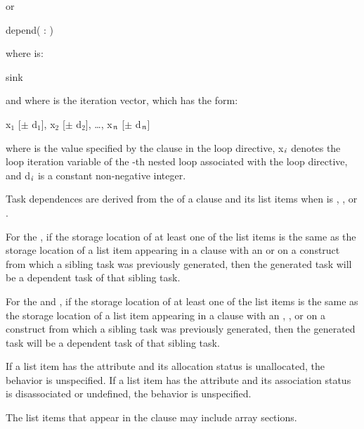 or

\begin{boxedcode}
depend( : )
\end{boxedcode}

where  is:
\begin{indentedcodelist}
sink
\end{indentedcodelist}

and where  is the iteration vector, which has the form:

x$_{1}$ [$\pm $ d$_{1}$], x$_{2}$ [$\pm $ d$_{2}$], \ldots, x$_{{\textrm{\textmd{\itshape{n}}}}}$ [$\pm $ d$_{{\textrm{\textmd{\itshape{n}}}}}$]

where  is the value specified by the  clause in the loop
directive, x$_{{\textrm{\textmd{\itshape{i}}}}}$ denotes the loop iteration variable of the -th
nested loop associated with the loop directive, and d$_{{\textrm{\textmd{\itshape{i}}}}}$ is a
constant non-negative integer.

\descr
Task dependences are derived from the  of a  clause and its list 
items when  is , , or .

For the  , if the storage location of at least one
of the list items is the same as the storage location of a list item appearing
in a  clause with an  or   on a construct
from which a sibling task was previously generated, then the generated task
will be a dependent task of that sibling task.

For the  and  , if the storage location of at least one
of the list items is the same as the storage location of a list item appearing
in a  clause with an , , or   on
a construct from which a sibling task was previously generated, then the
generated task will be a dependent task of that sibling task.

\begin{fortranspecific}
If a list item has the  attribute and its allocation
status is unallocated, the behavior is unspecified. If a list item has
the  attribute and its association status is
disassociated or undefined, the behavior is unspecified.

The list items that appear in the  clause may include array sections.
\end{fortranspecific}

